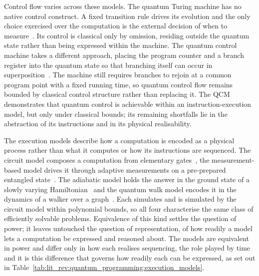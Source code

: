 Control flow varies across these models.
The quantum Turing machine has no native control construct.
A fixed transition rule drives its evolution and the only choice exercised over the computation is the external decision of when to measure~\cite{bernstein1997quantum}.
Its control is classical only by omission, residing outside the quantum state rather than being expressed within the machine.
The quantum control machine takes a different approach, placing the program counter and a branch register into the quantum state so that branching itself can occur in superposition~\cite{yuan2025foundationalabstractions}.
The machine still requires branches to rejoin at a common program point with a fixed running time, so quantum control flow remains bounded by classical control structure rather than replacing it.
The QCM demonstrates that quantum control is achievable within an instruction-execution model, but only under classical bounds; its remaining shortfalls lie in the abstraction of its instructions and in its physical realisability.

The execution models describe how a computation is encoded as a physical process rather than what it computes or how its instructions are sequenced.
The circuit model composes a computation from elementary gates~\cite{yao1993circuit}, the measurement-based model drives it through adaptive measurements on a pre-prepared entangled state~\cite{raussendorf2001oneway}.
The adiabatic model holds the answer in the ground state of a slowly varying Hamiltonian~\cite{aharonov2007adiabatic} and the quantum walk model encodes it in the dynamics of a walker over a graph~\cite{childs2009quantumwalk}.
Each simulates and is simulated by the circuit model within polynomial bounds, so all four characterise the same class of efficiently solvable problems.
Equivalence of this kind settles the question of power; it leaves untouched the question of representation, of how readily a model lets a computation be expressed and reasoned about.
The models are equivalent in power and differ only in how each realises sequencing, the role played by time and it is this difference that governs how readily each can be expressed, as set out in Table~\ref{tab:lit_rev:quantum_programming:execution_models}.

